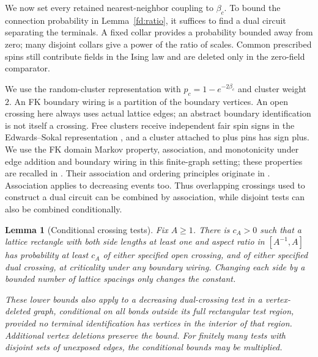 \documentclass[11pt]{article}
\newtheorem{lemma}[theorem]{Lemma}
\theoremstyle{definition}
\theoremstyle{remark}
\numberwithin{equation}{section}
\begin{document}
We now set every retained nearest-neighbor coupling to $\beta_c$.
To bound the connection probability in Lemma~\ref{fd:ratio}, it suffices
to find a dual circuit separating the terminals. A fixed collar provides
a probability bounded away from zero; many disjoint collars give a power
of the ratio of scales. Common prescribed spins still contribute fields
in the Ising law and are deleted only in the zero-field comparator.

We use the random-cluster representation with
\(p_c=1-e^{-2\beta_c}\) and cluster weight \(2\).  An FK boundary wiring is
a partition of the boundary vertices.  An open crossing here always uses
actual lattice edges; an abstract boundary identification is not itself a
crossing.  Free clusters receive independent fair spin signs in the
Edwards--Sokal representation \cite{EdwardsSokal1988}, and a cluster attached to plus pins has sign
plus.
We use the FK domain Markov property, association, and monotonicity
under edge addition and boundary wiring in this finite-graph setting;
these properties are recalled in \cite[Section~2]{DHN2011}. Their
association and ordering principles originate in
\cite{FKG1971,Holley1974}.
Association applies to decreasing events too.  Thus overlapping
crossings used to construct a dual circuit can be combined by
association, while disjoint tests can also be combined conditionally.

\begin{lemma}[Conditional crossing tests]\label{fd:conditional-rsw}
Fix \(A\ge1\).  There is \(c_A>0\) such that a lattice rectangle with both
side lengths at least one and aspect ratio in \([A^{-1},A]\) has probability
at least \(c_A\) of either specified open crossing, and of either specified
dual crossing, at criticality under any boundary wiring.  Changing each
side by a bounded number of lattice spacings only changes the constant.

These lower bounds also apply to a decreasing dual-crossing test in a
vertex-deleted graph, conditional on all bonds outside its full rectangular
test region, provided no terminal identification has vertices in the
interior of that region.  Additional vertex deletions preserve the bound.
For finitely many tests with disjoint sets of unexposed edges, the conditional
bounds may be multiplied.
\end{lemma}
\end{document}
